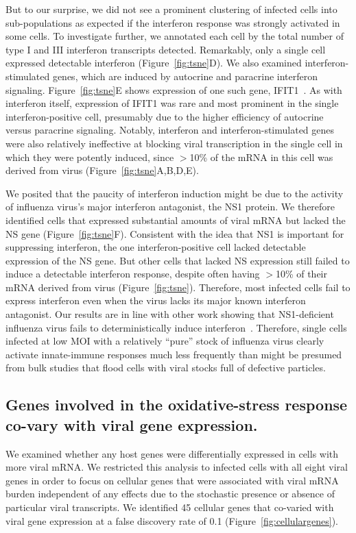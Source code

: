 \documentclass[9pt,lineno]{elife}
\begin{document}
But to our surprise, we did not see a prominent clustering of infected cells into sub-populations as expected if the interferon response was strongly activated in some cells.
To investigate further, we annotated each cell by the total number of type I and III interferon transcripts detected.
Remarkably, only a single cell expressed detectable interferon (Figure~\ref{fig:tsne}D).
We also examined interferon-stimulated genes, which are induced by autocrine and paracrine interferon signaling.
Figure~\ref{fig:tsne}E shows expression of one such gene, IFIT1~\citep{Fensterl:2011fp}.
As with interferon itself, expression of IFIT1 was rare and most prominent in the single interferon-positive cell, presumably due to the higher efficiency of autocrine versus paracrine signaling.
Notably, interferon and interferon-stimulated genes were also relatively ineffective at blocking viral transcription in the single cell in which they were potently induced, since $>$10\% of the mRNA in this cell was derived from virus (Figure~\ref{fig:tsne}A,B,D,E).

We posited that the paucity of interferon induction might be due to the activity of influenza virus's major interferon antagonist, the NS1 protein.
We therefore identified cells that expressed substantial amounts of viral mRNA but lacked the NS gene (Figure~\ref{fig:tsne}F).
Consistent with the idea that NS1 is important for suppressing interferon, the one interferon-positive cell lacked detectable expression of the NS gene.
But other cells that lacked NS expression still failed to induce a detectable interferon response, despite often having $>$10\% of their mRNA derived from virus (Figure~\ref{fig:tsne}).
Therefore, most infected cells fail to express interferon even when the virus lacks its major known interferon antagonist.
Our results are in line with other work showing that NS1-deficient influenza virus fails to deterministically induce interferon~\citep{Killip:2017ef,Kallfass:2013kp}.
Therefore, single cells infected at low MOI with a relatively ``pure'' stock of influenza virus clearly activate innate-immune responses much less frequently than might be presumed from bulk studies that flood cells with viral stocks full of defective particles.

\subsection{Genes involved in the oxidative-stress response co-vary with viral gene expression.}
We examined whether any host genes were differentially expressed in cells with more viral mRNA.
We restricted this analysis to infected cells with all eight viral genes in order to focus on cellular genes that were associated with viral mRNA burden independent of any effects due to the stochastic presence or absence of particular viral transcripts.
We identified 45 cellular genes that co-varied with viral gene expression at a false discovery rate of 0.1 (Figure~\ref{fig:cellulargenes}).
\end{document}

